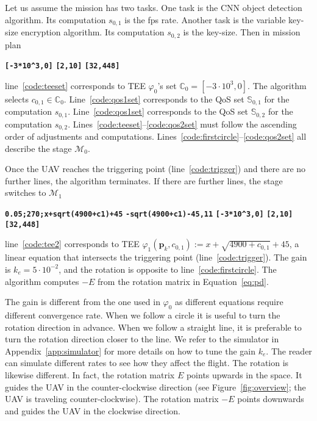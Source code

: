 \documentclass[letterpaper,10pt,conference]{ieeeconf}
\theoremstyle{definition}
\begin{document}
Let us assume the mission has two tasks. One task is the CNN object detection algorithm. Its computation $s_{0,1}$ is the fps rate. Another task is the variable key-size encryption algorithm. Its computation $s_{0,2}$ is the key-size. Then in mission plan
\begin{algorithmic}[1]
  \State\textbf{\texttt{[-3*10\^{}3,0]}}\label{code:teeset}
  \State\textbf{\texttt{[2,10]}}\label{code:qos1set}
  \State\textbf{\texttt{[32,448]}}\label{code:qos2set}
\end{algorithmic}
line~\ref{code:teeset} corresponds to TEE $\varphi_0$'s set $\mathbb{C}_0=[-3\cdot10^3,0]$. The algorithm selects $c_{0,1}\in\mathbb{C}_0$. Line~\ref{code:qos1set} corresponds to the QoS set $\mathbb{S}_{0,1}$ for the computation $s_{0,1}$. Line~\ref{code:qos1set} corresponds to the QoS set $\mathbb{S}_{0,2}$ for the computation $s_{0,2}$. Lines~\ref{code:teeset}--\ref{code:qos2set} must follow the ascending order of adjustments and computations. Lines~\ref{code:firstcircle}--\ref{code:qos2set} all describe the stage $\mathcal{M}_0$.

Once the UAV reaches the triggering point (line~\ref{code:trigger}) and there are no further lines, the algorithm terminates. If there are further lines, the stage switches to $\mathcal{M}_1$
\begin{algorithmic}[1]
  \State\textbf{\texttt{0.05;270;x+sqrt(4900+c1)+45}}\label{code:tee2}
  \State\textbf{\texttt{-sqrt(4900+c1)-45,11}}\label{code:trigger2}
  \State\textbf{\texttt{[-3*10\^{}3,0]}}\label{code:teeset2}
  \State\textbf{\texttt{[2,10]}}
  \State\textbf{\texttt{[32,448]}}\label{code:qosset12}
\end{algorithmic}
line~\ref{code:tee2} corresponds to TEE $\varphi_1(\mathbf{p}_k,c_{0,1}):=x+\sqrt{4900+c_{0,1}}+45$, a linear equation that intersects the triggering point (line~\ref{code:trigger}). The gain is $k_e=5\cdot 10^{-2}$, and the rotation is opposite to line~\ref{code:firstcircle}. The algorithm computes $-E$ from the rotation matrix in Equation~\ref{eq:pd}. 

The gain is different from the one used in $\varphi_0$ as different equations require different convergence rate. When we follow a circle it is useful to turn the rotation direction in advance. When we follow a straight line, it is preferable to turn the rotation direction closer to the line. We refer to the simulator in Appendix~\ref{app:simulator} for more details on how to tune the gain $k_e$. The reader can simulate different rates to see how they affect the flight. The rotation is likewise different. In fact, the rotation matrix $E$ points upwards in the space. It guides the UAV in the counter-clockwise direction (see Figure~\ref{fig:overview}; the UAV is traveling counter-clockwise). The rotation matrix $-E$ points downwards and guides the UAV in the clockwise direction.
\end{document}
